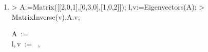 \begin{enumerate}
\begin{MapleOutputGather}
 \notag \\
\left[ \begin {array}{c}  0.7071067810\\   0.0\\   0.7071067810\end {array} \right] \notag \\
\end{MapleOutputGather}

\item
\begin{MapleInput}
> A:=Matrix([[2,0,1],[0,3,0],[1,0,2]]); l,v:=Eigenvectors(A);
> MatrixInverse(v).A.v;
\end{MapleInput}
\begin{MapleOutputGather}
A\, := \,  \notag \\
l,\,v\, := \, \left[ \begin {array}{c} 3\\  3\\  1\end {array} \right] ,\,  \notag \\
 \notag
\end{MapleOutputGather}
\end{enumerate}